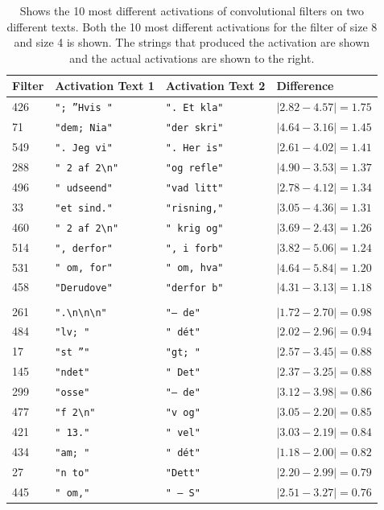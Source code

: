 \begin{table}
    \begin{tabular}{llll}
        \textbf{Filter} & \textbf{Activation Text 1} &
        \textbf{Activation Text 2} & \textbf{Difference} \\
        \hline
        426 & \verb'"; ”Hvis "'  & \verb'". Et kla"' & $|2.82 - 4.57| = 1.75$ \\
        71  & \verb'"dem; Nia"'  & \verb'"der skri"' & $|4.64 - 3.16| = 1.45$ \\
        549 & \verb'". Jeg vi"'  & \verb'". Her is"' & $|2.61 - 4.02| = 1.41$ \\
        288 & \verb'" 2 af 2\n"' & \verb'"og refle"' & $|4.90 - 3.53| = 1.37$ \\
        496 & \verb'" udseend"'  & \verb'"vad litt"' & $|2.78 - 4.12| = 1.34$ \\
        33  & \verb'"et sind."'  & \verb'"risning,"' & $|3.05 - 4.36| = 1.31$ \\
        460 & \verb'" 2 af 2\n"' & \verb'" krig og"' & $|3.69 - 2.43| = 1.26$ \\
        514 & \verb'", derfor"'  & \verb'", i forb"' & $|3.82 - 5.06| = 1.24$ \\
        531 & \verb'" om, for"'  & \verb'" om, hva"' & $|4.64 - 5.84| = 1.20$ \\
        458 & \verb'"Derudove"'  & \verb'"derfor b"' & $|4.31 - 3.13| = 1.18$ \\
        \\
        261 & \verb'".\n\n\n"'   & \verb'"– de"'     & $|1.72 - 2.70| = 0.98$ \\
        484 & \verb'"lv; "'      & \verb'" dét"'     & $|2.02 - 2.96| = 0.94$ \\
        17  & \verb'"st ”"'      & \verb'"gt; "'     & $|2.57 - 3.45| = 0.88$ \\
        145 & \verb'"ndet"'      & \verb'" Det"'     & $|2.37 - 3.25| = 0.88$ \\
        299 & \verb'"osse"'      & \verb'"– de"'     & $|3.12 - 3.98| = 0.86$ \\
        477 & \verb'"f 2\n"'     & \verb'"v og"'     & $|3.05 - 2.20| = 0.85$ \\
        421 & \verb'" 13."'      & \verb'" vel"'     & $|3.03 - 2.19| = 0.84$ \\
        434 & \verb'"am; "'      & \verb'" dét"'     & $|1.18 - 2.00| = 0.82$ \\
        27  & \verb'"n to"'      & \verb'"Dett"'     & $|2.20 - 2.99| = 0.79$ \\
        445 & \verb'" om,"'      & \verb'" – S"'     & $|2.51 - 3.27| = 0.76$ \\
    \end{tabular}
    \caption{Shows the 10 most different activations of convolutional filters on
        two different texts. Both the 10 most different activations for the
        filter of size 8 and size 4 is shown. The strings that produced the
        activation are shown and the actual activations are shown to the right.}
    \label{tab:teacher_feedback_output}
\end{table}
